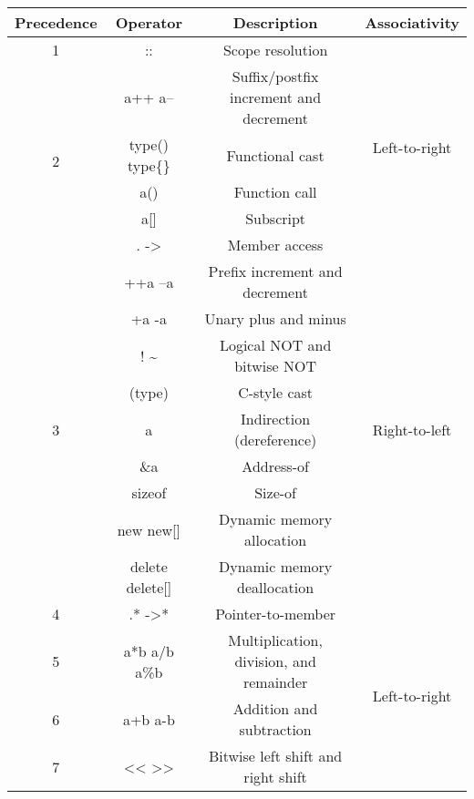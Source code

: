 \begin{center}
	\begin{tabular}{|c|c|c|c|}
		\hline
		Precedence			&	Operator					&	Description												&	Associativity					\\
		\hline
		1					&	\ttfamily ::				&	Scope resolution										&	\multirow{6}{*}{Left-to-right}	\\
		\cline{1-3}
		\multirow{5}{*}{2}	&	\ttfamily a++ a--			&	Suffix/postfix increment and decrement					&									\\
							&	\ttfamily type() type\{\}	&	Functional cast											&									\\
							&	\ttfamily a()				&	Function call											&									\\
							&	\ttfamily a[]				&	Subscript												&									\\
							&	\ttfamily . ->				&	Member access											&									\\
		\hline	
		\multirow{9}{*}{3}	&	\ttfamily ++a --a			&	Prefix increment and decrement							&	\multirow{9}{*}{Right-to-left}	\\
							&	\ttfamily +a -a				&	Unary plus and minus									&									\\
							&	\ttfamily ! \~				&	Logical NOT and bitwise NOT								&									\\
							&	\ttfamily (type)			&	C-style cast											&									\\
							&	\ttfamily *a				&	Indirection (dereference)								&									\\
							&	\ttfamily \&a				&	Address-of												&									\\
							&	\ttfamily sizeof			&	Size-of													&									\\
							&	\ttfamily new new[]			&	Dynamic memory allocation								&									\\
							&	\ttfamily delete delete[]	&	Dynamic memory deallocation								&									\\
		\hline
		4					&	\ttfamily .* ->*			&	Pointer-to-member										&	\multirow{12}{*}{Left-to-right}	\\
		\cline{1-3}
		5					&	\ttfamily a*b a/b a\%b		&	Multiplication, division, and remainder					&									\\
		\cline{1-3}
		6					&	\ttfamily a+b a-b			&	Addition and subtraction								&									\\
		\cline{1-3}
		7					&	\ttfamily << >>				&	Bitwise left shift and right shift						&									\\
		\cline{1-3}

\end{tabular}
\end{center}
